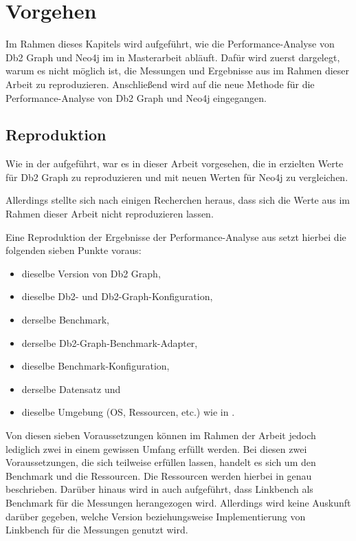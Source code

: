 \chapter{Vorgehen}
\label{vorgehen}
Im Rahmen dieses Kapitels wird aufgeführt, wie die Performance-Analyse von Db2 Graph und Neo4j im in Masterarbeit abläuft. Dafür wird zuerst dargelegt, warum es nicht möglich ist, die Messungen und Ergebnisse aus \cite{sigmod_tian} im Rahmen dieser Arbeit zu reproduzieren. Anschließend wird auf die neue Methode für die Performance-Analyse von Db2 Graph und Neo4j eingegangen. 

\section{Reproduktion}
\label{analyse:reproduktion}
Wie in der  aufgeführt, war es in dieser Arbeit vorgesehen, die in \cite{sigmod_tian} erzielten Werte für Db2 Graph zu reproduzieren und mit neuen Werten für Neo4j zu vergleichen. 

Allerdings stellte sich nach einigen Recherchen heraus, dass sich die Werte aus \cite{sigmod_tian} im Rahmen dieser Arbeit nicht reproduzieren lassen. 

Eine Reproduktion der Ergebnisse der Performance-Analyse aus \cite{sigmod_tian} setzt hierbei die folgenden sieben Punkte voraus:
\begin{itemize}
    \item dieselbe Version von Db2 Graph,
    \item dieselbe Db2- und Db2-Graph-Konfiguration,
    \item derselbe Benchmark,
    \item derselbe Db2-Graph-Benchmark-Adapter,
    \item dieselbe Benchmark-Konfiguration,
    \item derselbe Datensatz und 
    \item dieselbe Umgebung (OS, Ressourcen, etc.) wie in \cite{sigmod_tian}.
\end{itemize}
Von diesen sieben Voraussetzungen können im Rahmen der Arbeit jedoch lediglich zwei in einem gewissen Umfang erfüllt werden. Bei diesen zwei Voraussetzungen, die sich teilweise erfüllen lassen, handelt es sich um den Benchmark und die Ressourcen. Die Ressourcen werden hierbei in \cite{sigmod_tian} genau beschrieben. Darüber hinaus wird in \cite{sigmod_tian} auch aufgeführt, dass Linkbench als Benchmark für die Messungen herangezogen wird. Allerdings wird keine Auskunft darüber gegeben, welche Version beziehungsweise Implementierung von Linkbench für die Messungen genutzt wird.

